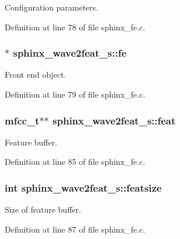 \-Configuration parameters. 



\-Definition at line 78 of file sphinx\-\_\-fe.\-c.

\subsubsection[{fe}]{$\ast$ {\bf sphinx\-\_\-wave2feat\-\_\-s\-::fe}}\label{structsphinx__wave2feat__s_a5882f148fe200890855304b46f00ee4b}


\-Front end object. 



\-Definition at line 79 of file sphinx\-\_\-fe.\-c.

\subsubsection[{feat}]{\setlength{\rightskip}{0pt plus 5cm}mfcc\-\_\-t$\ast$$\ast$ {\bf sphinx\-\_\-wave2feat\-\_\-s\-::feat}}\label{structsphinx__wave2feat__s_ab43d8d5721133bcaf02da23c0bbb58ae}


\-Feature buffer. 



\-Definition at line 85 of file sphinx\-\_\-fe.\-c.

\subsubsection[{featsize}]{\setlength{\rightskip}{0pt plus 5cm}int {\bf sphinx\-\_\-wave2feat\-\_\-s\-::featsize}}\label{structsphinx__wave2feat__s_ac041852de738a42752be67cceb16660c}


\-Size of feature buffer. 



\-Definition at line 87 of file sphinx\-\_\-fe.\-c.

